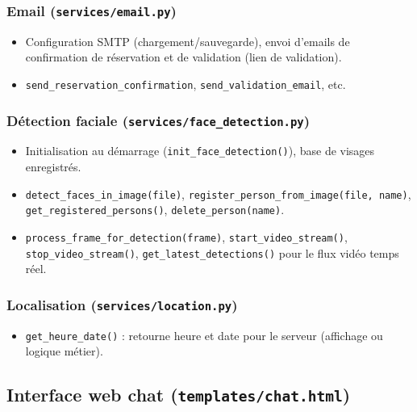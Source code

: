 \documentclass[12pt,a4paper]{article}
\begin{document}
\subsubsection{Email (\texttt{services/email.py})}

\begin{itemize}[noitemsep]
  \item Configuration SMTP (chargement/sauvegarde), envoi d'emails de confirmation de réservation et de validation (lien de validation).
  \item \texttt{send\_reservation\_confirmation}, \texttt{send\_validation\_email}, etc.
\end{itemize}

\subsubsection{Détection faciale (\texttt{services/face\_detection.py})}

\begin{itemize}[noitemsep]
  \item Initialisation au démarrage (\texttt{init\_face\_detection()}), base de visages enregistrés.
  \item \texttt{detect\_faces\_in\_image(file)}, \texttt{register\_person\_from\_image(file, name)}, \texttt{get\_registered\_persons()}, \texttt{delete\_person(name)}.
  \item \texttt{process\_frame\_for\_detection(frame)}, \texttt{start\_video\_stream()}, \texttt{stop\_video\_stream()}, \texttt{get\_latest\_detections()} pour le flux vidéo temps réel.
\end{itemize}

\subsubsection{Localisation (\texttt{services/location.py})}

\begin{itemize}[noitemsep]
  \item \texttt{get\_heure\_date()} : retourne heure et date pour le serveur (affichage ou logique métier).
\end{itemize}

\subsection{Interface web chat (\texttt{templates/chat.html})}
\end{document}
